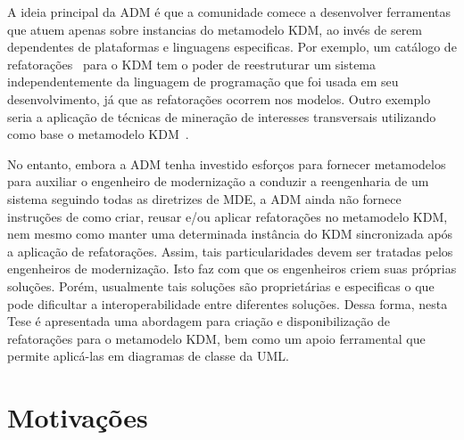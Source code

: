 A ideia principal da ADM é que a comunidade comece a desenvolver ferramentas que atuem apenas sobre instancias do metamodelo KDM, ao invés de serem dependentes de plataformas e linguagens especificas. Por exemplo, um catálogo de refatorações~\cite{durelli_catalogo} para o KDM tem o poder de reestruturar um sistema independentemente da linguagem de programação que foi usada em seu desenvolvimento, já que as refatorações ocorrem nos modelos. Outro exemplo seria a aplicação de técnicas de mineração de interesses transversais utilizando como base o metamodelo KDM~\cite{Durelli:2013_ACM, dani_san, daniel_san_journal}.


No entanto, embora a ADM tenha investido esforços para fornecer metamodelos para auxiliar o engenheiro de modernização a conduzir a reengenharia de um sistema seguindo todas as diretrizes de MDE, a ADM ainda não fornece instruções de como criar, reusar e/ou aplicar refatorações no metamodelo KDM, nem mesmo como manter uma determinada instância do KDM sincronizada após a aplicação de refatorações. Assim, tais particularidades devem ser tratadas pelos engenheiros de modernização. Isto faz com que os engenheiros criem suas próprias soluções. Porém, usualmente tais soluções são proprietárias e especificas o que pode dificultar a interoperabilidade entre diferentes soluções. Dessa forma, nesta Tese é apresentada uma abordagem para criação e disponibilização de refatorações para o metamodelo KDM, bem como um apoio ferramental que permite aplicá-las em diagramas de classe da UML. 




\section{Motivações}\label{sec:justificativa_e_motivacao}

